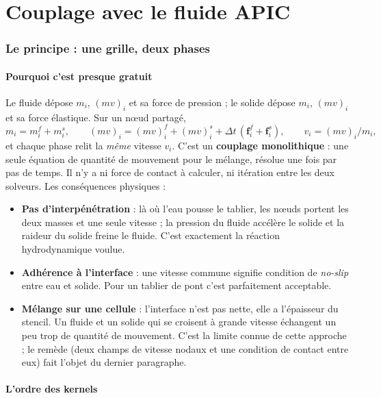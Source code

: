 \documentclass[11pt,a4paper]{article}
\begin{document}
\part{Couplage avec le fluide APIC}

\section{Le principe : une grille, deux phases}

\subsection{Pourquoi c'est presque gratuit}

Le fluide dépose $m_i$, $(mv)_i$ et sa force de pression ; le solide dépose $m_i$, $(mv)_i$ et sa
force élastique. Sur un n\oe ud partagé,
\[
  m_i = m_i^{f} + m_i^{s},\qquad (mv)_i = (mv)_i^{f} + (mv)_i^{s} + \Delta t\,(\mathbf f_i^{f} + \mathbf f_i^{s}),
  \qquad v_i = (mv)_i / m_i,
\]
et chaque phase relit la \emph{même} vitesse $v_i$. C'est un \textbf{couplage monolithique} : une
seule équation de quantité de mouvement pour le mélange, résolue une fois par pas de temps. Il
n'y a ni force de contact à calculer, ni itération entre les deux solveurs. Les conséquences
physiques :
\begin{itemize}
  \item \textbf{Pas d'interpénétration} : là où l'eau pousse le tablier, les n\oe uds portent les deux
        masses et une seule vitesse ; la pression du fluide accélère le solide et la raideur du
        solide freine le fluide. C'est exactement la réaction hydrodynamique voulue.
  \item \textbf{Adhérence à l'interface} : une vitesse commune signifie condition de \emph{no-slip}
        entre eau et solide. Pour un tablier de pont c'est parfaitement acceptable.
  \item \textbf{Mélange sur une cellule} : l'interface n'est pas nette, elle a l'épaisseur du
        stencil. Un fluide et un solide qui se croisent à grande vitesse échangent un peu trop de
        quantité de mouvement. C'est la limite connue de cette approche ; le remède (deux champs
        de vitesse nodaux et une condition de contact entre eux) fait l'objet du dernier
        paragraphe.
\end{itemize}

\subsection{L'ordre des kernels}
\end{document}
